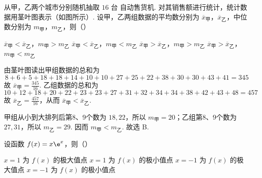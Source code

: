 \begin{problem}
从甲，乙两个城市分别随机抽取 \(16\text{ 台}\) 自动售货机. 对其销售额进行统计，统计数据用茎叶图表示（如图所示）. 设甲，乙两组数据的平均数分别为 \(\overline{x}_{\text{甲}}\)，\(\overline{x}_{\text{乙}}\)，中位数分别为 \(m_{\text{甲}}\)，\(m_{\text{乙}}\)，则（\quad）



\choices
    {\(\overline{x}_\text{甲} < \overline{x}_\text{乙}\)，\(m_{\text{甲}} > m_\text{乙}\)}
    {\(\overline{x}_\text{甲} < \overline{x}_\text{乙}\)，\(m_{\text{甲}} < m_\text{乙}\)}
    {\(\overline{x}_{\text{甲}} > \overline{x}_{\text{乙}}\)，\(m_{\text{甲}} > m_{\text{乙}}\)}
    {\(\overline{x}_{\text{甲}} > \overline{x}_{\text{乙}}\)，\(m_{\text{甲}} < m_{\text{乙}}\)}
\end{problem}


\begin{solution}
由茎叶图读出甲组数据的总和为
\[
8+6+5+18+18+14+10+10+27+25+22+38+30+30+43+41=345
\]
故 \(\overline{x}_{\text{甲}}=\frac{345}{16}\). 乙组数据的总和为
\[
10+12+18+20+22+23+23+27+31+32+34+34+38+42+43+48=457
\]
故 \(\overline{x}_{\text{乙}}=\frac{457}{16}\)，从而 \(\overline{x}_{\text{甲}}<\overline{x}_{\text{乙}}\).

甲组从小到大排列后第8、9个数为 \(18,22\)，所以 \(m_{\text{甲}}=20\)；乙组第8、9个数为 \(27,31\)，所以 \(m_{\text{乙}}=29\). 因而 \(m_{\text{甲}}<m_{\text{乙}}\).
故选 B.
\end{solution}

\begin{problem}
设函数 \( f(x) = x\e^{x} \)，则（\quad）

\choices
    {\(x = 1\) 为 \(f(x)\) 的极大值点}
    {\(x = 1\) 为 \(f(x)\) 的极小值点}
    {\(x = -1\) 为 \(f(x)\) 的极大值点}
    {\(x = -1\) 为 \(f(x)\) 的极小值点}
\end{problem}

